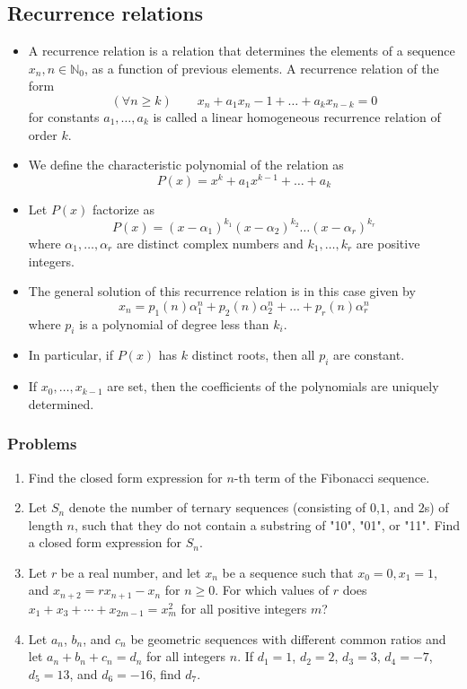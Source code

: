 \documentclass{article}
\begin{document}
	\subsection{Recurrence relations} %
		\begin{itemize}
			\item 
			A recurrence relation is a relation that determines the elements of a sequence $x_n, n \in \mathbb{N}_0$, as a function of previous elements. A recurrence relation of the form
			$$(\forall n \geq k) \hspace{2em} x_n + a_1x_n-1 + \hdots + a_kx_{n-k} = 0$$
			for constants $a_1, \hdots, a_k$ is called a linear homogeneous recurrence relation of order $k$.
			\item	
			We define the characteristic polynomial of the relation as 
			$$P(x) = x^k + a_1x^{k-1} + \hdots + a_k$$
			\item
			Let $P(x)$	factorize as 
			$$P(x) = (x-\alpha_1)^{k_1}(x-\alpha_2)^{k_2} \hdots (x-\alpha_r)^{k_r}$$
			where $\alpha_1, \hdots , \alpha_r$ are distinct complex numbers and $k_1, \hdots, k_r$ are positive integers. 
			\item 
			The general solution of this recurrence relation is in this case given by
			$$x_n = p_1(n)\alpha_1^n + p_2(n)\alpha_2^n + \hdots + p_r(n)\alpha_r^n$$
			where $p_i$ is a polynomial of degree less than $k_i$.
			\item
			In particular, if $P(x)$ has $k$
			distinct roots, then all $p_i$ are constant.
			\item 
			If $x_0, \hdots, x_{k-1}$ are set, then the coefficients of the polynomials are uniquely determined.
		\end{itemize}
			
			\subsubsection*{Problems}
			\begin{enumerate}
				\item 
				Find the closed form expression for $n$-th term of the Fibonacci sequence.
				\item
				Let $S_n$ denote the number of ternary sequences (consisting of $0$,$1$, and $2$s) of length $n$, such that they do not contain a substring of "10", "01", or "11". Find a closed form expression for $S_n$.
				\item
				Let $r$ be a real number, and let $x_n$ be a sequence such that $x_0 = 0, x_1 = 1$, and $x_{n+2} = rx_{n+1} - x_n$ for $n \ge 0$. For which values of $r$ does $x_1 + x_3 + \cdots + x_{2m-1} = x_m^2$ for all positive integers $m$?
				\item
				Let $a_{n}$, $b_{n}$, and $c_{n}$ be geometric sequences with different common ratios and let $a_{n}+b_{n}+c_{n}=d_{n}$ for all integers $n$. If $d_{1}=1$, $d_{2}=2$, $d_{3}=3$, $d_{4}=-7$, $d_{5}=13$, and $d_{6}=-16$, find $d_{7}$.
			\end{enumerate}
\end{document}
